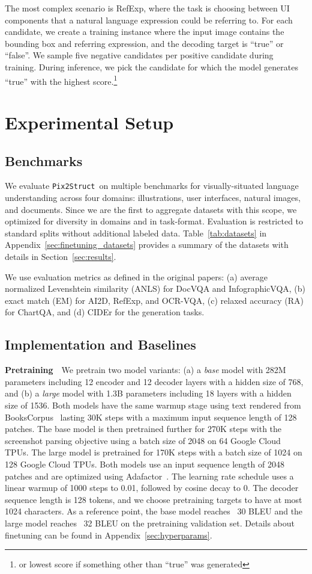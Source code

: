 \documentclass{article} %
\newcommand\ourmodel{{\texttt{Pix2Struct}}}
\begin{document}
The most complex scenario is RefExp, where the task is choosing between UI components that a natural language expression could be referring to. For each candidate, we create a training instance where the input image contains the bounding box and referring expression, and the decoding target is ``true'' or ``false''. We sample five negative candidates per positive candidate during training. During inference, we pick the candidate for which the model generates ``true'' with the highest score.\footnote{or lowest score if something other than ``true'' was generated}
 

\section{Experimental Setup}
\subsection{Benchmarks}
We evaluate \ourmodel~on multiple benchmarks for visually-situated language understanding across four domains: illustrations, user interfaces, natural images, and documents. Since we are the first to aggregate datasets with this scope, we optimized for diversity in domains and in task-format. Evaluation is restricted to standard splits without additional labeled data. 
Table~\ref{tab:datasets} in Appendix~\ref{sec:finetuning_datasets} provides a summary of the datasets with details in Section~\ref{sec:results}.

We use evaluation metrics as defined in the original papers: (a) average normalized Levenshtein similarity (ANLS) for DocVQA and InfographicVQA, (b) exact match (EM) for AI2D, RefExp, and OCR-VQA, (c) relaxed accuracy (RA) for ChartQA, and (d) CIDEr for the generation tasks.

\subsection{Implementation and Baselines}
\textbf{Pretraining}~~We pretrain two model variants: (a) a \emph{base} model with 282M parameters including 12 encoder and 12 decoder layers with a hidden size of 768, and (b) a \emph{large} model with 1.3B parameters including 18 layers with a hidden size of 1536. Both models have the same warmup stage using text rendered from BooksCorpus~\citep{books} lasting 30K steps with a maximum input sequence length of 128 patches. The base model is then pretrained further for 270K steps with the screenshot parsing objective using a batch size of 2048 on 64 Google Cloud TPUs. 
The large model is pretrained for 170K steps with a batch size of 1024 on 128 Google Cloud TPUs. 
Both models use an input sequence length of 2048 patches and are optimized using Adafactor~\citep{shazeer2018adafactor}. The learning rate schedule uses a linear warmup of 1000 steps to 0.01, followed by cosine decay to 0. The decoder sequence length is 128 tokens, and we choose pretraining targets to have at most 1024 characters. As a reference point, the base model reaches ~30 BLEU and the large model reaches ~32 BLEU on the pretraining validation set. 
Details about finetuning can be found in Appendix~\ref{sec:hyperparams}.
\end{document}
